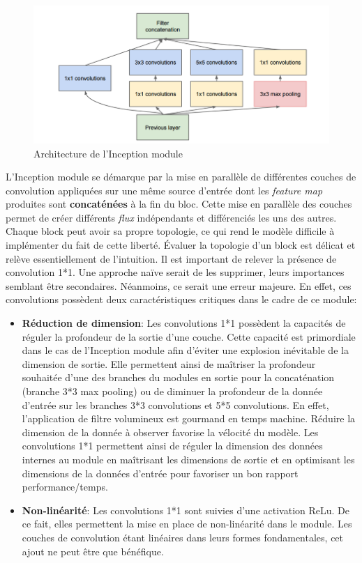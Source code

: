 \begin{figure}
    \centering
    \includegraphics[scale=0.3]{./tex/convolution-network/classifier/inception.png}
    \caption{Architecture de l'Inception module}
    \label{inception}
\end{figure}

\noindent L'Inception module se démarque par la mise en parallèle de différentes couches de convolution appliquées sur une même source d'entrée dont les \textit{feature map} produites sont \textbf{concaténées} à la fin du bloc. Cette mise en parallèle des couches permet de créer différents \textit{flux} indépendants et différenciés les uns des autres. Chaque block peut avoir sa propre topologie, ce qui rend le modèle difficile à implémenter du fait de cette liberté. Évaluer la topologie d'un block est délicat et relève essentiellement de l'intuition. Il est important de relever la présence de convolution 1*1. Une approche naïve serait de les supprimer, leurs importances semblant être secondaires. Néanmoins, ce serait une erreur majeure. En effet, ces convolutions possèdent deux caractéristiques critiques dans le cadre de ce module:

\begin{itemize}
    \item \textbf{Réduction de dimension}: Les convolutions 1*1 possèdent la capacités de réguler la profondeur de la sortie d'une couche. Cette capacité est primordiale dans le cas de l'Inception module afin d'éviter une explosion inévitable de la dimension de sortie. Elle permettent ainsi de maîtriser la profondeur souhaitée d'une des branches du modules en sortie pour la concaténation (branche 3*3 max pooling) ou de diminuer la profondeur de la donnée d'entrée sur les branches 3*3 convolutions et 5*5 convolutions. En effet, l'application de filtre volumineux est gourmand en temps machine. Réduire la dimension de la donnée à observer favorise la vélocité du modèle. Les convolutions 1*1 permettent ainsi de réguler la dimension des données internes au module en maîtrisant les dimensions de sortie et en optimisant les dimensions de la données d'entrée pour favoriser un bon rapport performance/temps.

    \item \textbf{Non-linéarité}: Les convolutions 1*1 sont suivies d'une activation ReLu. De ce fait, elles permettent la mise en place de non-linéarité dans le module. Les couches de convolution étant linéaires dans leurs formes fondamentales, cet ajout ne peut être que bénéfique.
\end{itemize}

